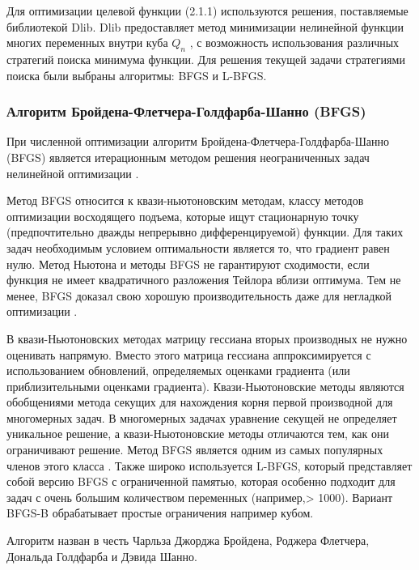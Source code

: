 \documentclass[12pt, a4paper]{extarticle}
\begin{document}
Для оптимизации целевой функции (2.1.1) используются решения, поставляемые библиотекой Dlib. Dlib предоставляет метод минимизации нелинейной функции многих переменных внутри куба $Q_n$ , с возможность использования различных стратегий поиска минимума функции. Для решения текущей задачи стратегиями поиска были выбраны алгоритмы: BFGS и L-BFGS.
\subsubsection{Алгоритм Бройдена-Флетчера-Голдфарба-Шанно (BFGS)}
При численной оптимизации алгоритм Бройдена-Флетчера-Голдфарба-Шанно (BFGS) является итерационным методом решения неограниченных задач нелинейной оптимизации \cite{6}.

Метод BFGS относится к квази-ньютоновским методам, классу методов оптимизации восходящего подъема, которые ищут стационарную точку (предпочтительно дважды непрерывно дифференцируемой) функции. Для таких задач необходимым условием оптимальности является то, что градиент равен нулю. Метод Ньютона и методы BFGS не гарантируют сходимости, если функция не имеет квадратичного разложения Тейлора вблизи оптимума. Тем не менее, BFGS доказал свою хорошую производительность даже для негладкой оптимизации \cite{7}.

В квази-Ньютоновских методах матрицу гессиана вторых производных не нужно оценивать напрямую. Вместо этого матрица гессиана аппроксимируется с использованием обновлений, определяемых оценками градиента (или приблизительными оценками градиента). Квази-Ньютоновские методы являются обобщениями метода секущих для нахождения корня первой производной для многомерных задач. В многомерных задачах уравнение секущей не определяет уникальное решение, а квази-Ньютоновские методы отличаются тем, как они ограничивают решение. Метод BFGS является одним из самых популярных членов этого класса \cite{8}. Также широко используется L-BFGS, который представляет собой версию BFGS с ограниченной памятью, которая особенно подходит для задач с очень большим количеством переменных (например,> 1000). Вариант BFGS-B \cite{9} обрабатывает простые ограничения например кубом.

Алгоритм назван в честь Чарльза Джорджа Бройдена, Роджера Флетчера, Дональда Голдфарба и Дэвида Шанно.
\end{document}
